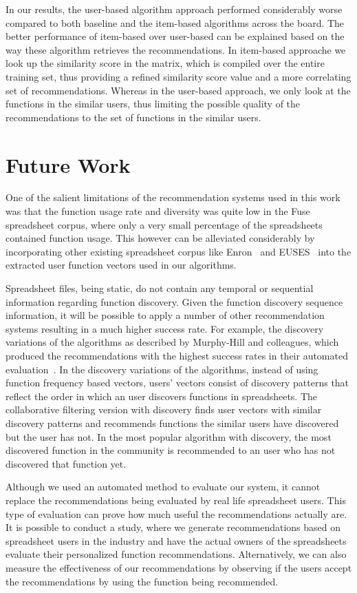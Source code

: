 \documentclass{article} %
\begin{document}
In our results, the user-based algorithm approach performed considerably worse compared to both baseline and the item-based algorithms across the board. The better performance of item-based over user-based can be explained based on the way these algorithm retrieves the recommendations. In item-based approache we look up the similarity score in the matrix, which is compiled over the entire training set, thus providing a refined similarity score value and a more correlating set of recommendations. Whereas in the user-based approach, we only look at the functions in the similar users, thus limiting the possible quality of the recommendations to the set of functions in the similar users.

\section{Future Work}
One of the salient limitations of the recommendation systems used in this work was that the function usage rate and diversity was quite low in the Fuse spreadsheet corpus, where only a very small percentage of the spreadsheets contained function usage. This however can be alleviated considerably by incorporating other existing spreadsheet corpus like Enron~\cite{hermans2014enron} and EUSES~\cite{fisher2005euses} into the extracted user function vectors used in our algorithms.

Spreadsheet files, being static, do not contain any temporal or sequential information regarding function discovery. Given the function discovery sequence information, it will be possible to apply a number of other recommendation systems resulting in a much higher success rate. For example, the discovery variations of the algorithms as described by Murphy-Hill and colleagues, which produced the recommendations with the highest success rates in their automated evaluation~\cite{murphy2012improving}. In the discovery variations of the algorithms, instead of using function frequency based vectors, users' vectors consist of discovery patterns that reflect the order in which an user discovers functions in spreadsheets. The collaborative filtering version with discovery finds user vectors with similar discovery patterns and recommends functions the similar users have discovered but the user has not. In the most popular algorithm with discovery, the most discovered function in the community is recommended to an user who has not discovered that function yet.

Although we used an automated method to evaluate our system, it cannot replace the recommendations being evaluated by real life spreadsheet users. This type of evaluation can prove how much useful the recommendations actually are. It is possible to conduct a study, where we generate recommendations based on spreadsheet users in the industry and have the actual owners of the spreadsheets evaluate their personalized function recommendations. Alternatively, we can also measure the effectiveness of our recommendations by observing if the users accept the recommendations by using the function being recommended.



\end{document}
